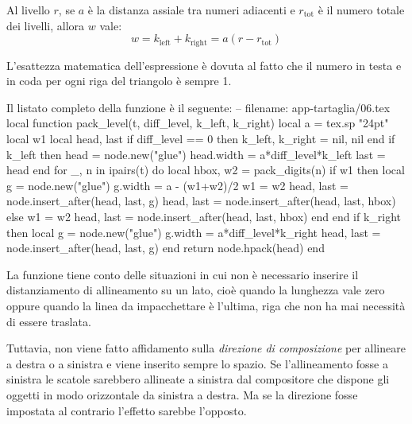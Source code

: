 Al livello \( r \), se \( a \) è la distanza assiale tra numeri adiacenti e \(
r_\mathrm{tot} \) è il numero totale dei livelli, allora \( w \) vale:
\[
w = k_\mathrm{left} + k_\mathrm{right} = a\left(r - r_\mathrm{tot}\right)
\]

L'esattezza matematica dell'espressione è dovuta al fatto che il numero in testa
e in coda per ogni riga del triangolo è sempre 1.

Il listato completo della funzione  è il seguente:
\lines
-- filename: app-tartaglia/06.tex
local function pack_level(t, diff_level, k_left, k_right)
    local a = tex.sp "24pt"
    local w1
    local head, last
    if diff_level == 0 then
        k_left, k_right = nil, nil
    end
    if k_left then
        head = node.new("glue")
        head.width = a*diff_level*k_left
        last = head
    end
    for _, n in ipairs(t) do
        local hbox, w2 = pack_digits(n)
        if w1 then
            local g = node.new("glue")
            g.width = a - (w1+w2)/2
            w1 = w2
            head, last = node.insert_after(head, last, g)
            head, last = node.insert_after(head, last, hbox)
        else
            w1 = w2
            head, last = node.insert_after(head, last, hbox)
        end
    end
    if k_right then
        local g = node.new("glue")
        g.width = a*diff_level*k_right
        head, last = node.insert_after(head, last, g)
    end
    return node.hpack(head)
end
\endlines
{}

La funzione tiene conto delle situazioni in cui non è necessario inserire il
distanziamento di allineamento su un lato, cioè quando la lunghezza vale zero
oppure quando la linea da impacchettare è l'ultima, riga che non ha mai
necessità di essere traslata.

Tuttavia, non viene fatto affidamento sulla \emph{direzione di composizione} per
allineare a destra o a sinistra e viene inserito sempre lo spazio. Se
l'allineamento fosse a sinistra le scatole sarebbero allineate a sinistra dal
compositore che dispone gli oggetti in modo orizzontale da sinistra a destra. Ma
se la direzione fosse impostata al contrario l'effetto sarebbe l'opposto.

